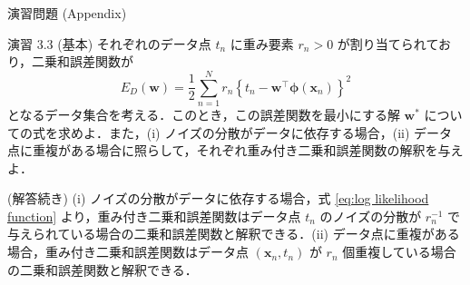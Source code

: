\documentclass[uplatex,11pt,dvipdfmx,aspectratio=169,unicode,t]{beamer}
\numberwithin{equation}{section}
\newcommand{\bs}[1]{\boldsymbol{#1}}
\newcommand{\1}{\bs{1}}
\newcommand{\0}{\bs{0}}
\begin{document}
\begin{frame}{演習問題 (Appendix)}
    \fontsize{7pt}{0cm}\selectfont
    \begin{block}{演習 3.3 (基本)}
        それぞれのデータ点 $t_{n}$ に重み要素 $r_{n} > 0$ が割り当てられており，二乗和誤差関数が
        \begin{equation}
            E_{D}(\bs{w}) = \frac{1}{2} \sum_{n=1}^{N} r_{n} \left\{t_{n} - \bs{w}^{\top} \bs{\phi}(\bs{x}_{n})\right\}^{2}
        \end{equation}
        となるデータ集合を考える．このとき，この誤差関数を最小にする解 $\bs{w}^{\ast}$ についての式を求めよ．また，(i) ノイズの分散がデータに依存する場合，(ii) データ点に重複がある場合に照らして，それぞれ重み付き二乗和誤差関数の解釈を与えよ．
    \end{block}
    (解答続き) (i) ノイズの分散がデータに依存する場合，式 \eqref{eq:log likelihood function} より，重み付き二乗和誤差関数はデータ点 $t_{n}$ のノイズの分散が $r_{n}^{-1}$ で与えられている場合の二乗和誤差関数と解釈できる．(ii) データ点に重複がある場合，重み付き二乗和誤差関数はデータ点 $(\bs{x}_{n},t_{n})$ が $r_{n}$ 個重複している場合の二乗和誤差関数と解釈できる．
\end{frame}
\end{document}
